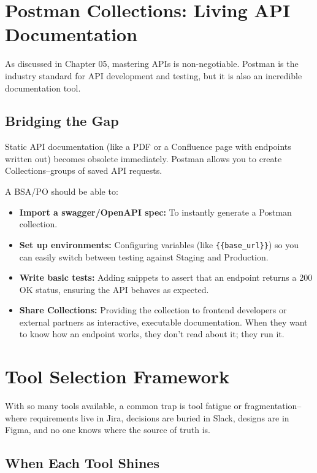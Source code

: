 \documentclass[
  11pt,
  openany,
  oneside]{book}
\providecommand{\tightlist}{%
  \setlength{\itemsep}{0pt}\setlength{\parskip}{0pt}}
\begin{document}
\section{Postman Collections: Living API
Documentation}\label{postman-collections-living-api-documentation}

As discussed in Chapter 05, mastering APIs is non-negotiable. Postman is
the industry standard for API development and testing, but it is also an
incredible documentation tool.

\subsection{Bridging the Gap}\label{bridging-the-gap}

Static API documentation (like a PDF or a Confluence page with endpoints
written out) becomes obsolete immediately. Postman allows you to create
Collections--groups of saved API requests.

A BSA/PO should be able to:

\begin{itemize}
\tightlist
\item
  \textbf{Import a swagger/OpenAPI spec:} To instantly generate a
  Postman collection.
\item
  \textbf{Set up environments:} Configuring variables (like
  \texttt{\{\{base\_url\}\}}) so you can easily switch between testing
  against Staging and Production.
\item
  \textbf{Write basic tests:} Adding snippets to assert that an endpoint
  returns a 200 OK status, ensuring the API behaves as expected.
\item
  \textbf{Share Collections:} Providing the collection to frontend
  developers or external partners as interactive, executable
  documentation. When they want to know how an endpoint works, they
  don't read about it; they run it.
\end{itemize}

\section{Tool Selection Framework}\label{tool-selection-framework}

With so many tools available, a common trap is tool fatigue or
fragmentation--where requirements live in Jira, decisions are buried in
Slack, designs are in Figma, and no one knows where the source of truth
is.

\subsection{When Each Tool Shines}\label{when-each-tool-shines}
\end{document}
